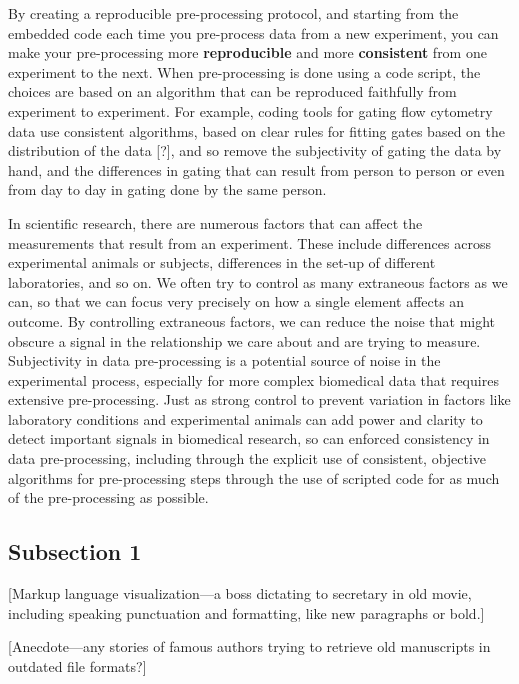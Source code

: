 \documentclass[]{tufte-book}
\begin{document}
By creating a reproducible pre-processing protocol, and starting from the
embedded code each time you pre-process data from a new experiment, you can
make your pre-processing more \textbf{reproducible} and more \textbf{consistent} from
one experiment to the next. When pre-processing is done using a code script,
the choices are based on an algorithm that can be reproduced faithfully from
experiment to experiment. For example, coding tools for gating flow cytometry
data use consistent algorithms, based on clear rules for fitting gates based
on the distribution of the data {[}?{]}, and so remove the subjectivity of
gating the data by hand, and the differences in gating that can result from
person to person or even from day to day in gating done by the same person.

In scientific research, there are numerous factors that can affect the
measurements that result from an experiment. These include differences across
experimental animals or subjects, differences in the set-up of different
laboratories, and so on. We often try to control as many extraneous factors as
we can, so that we can focus very precisely on how a single element affects an
outcome. By controlling extraneous factors, we can reduce the noise that might
obscure a signal in the relationship we care about and are trying to measure.
Subjectivity in data pre-processing is a potential source of noise in the
experimental process, especially for more complex biomedical data that requires
extensive pre-processing. Just as strong control to prevent variation in factors
like laboratory conditions and experimental animals can add power and clarity to
detect important signals in biomedical research, so can enforced consistency in
data pre-processing, including through the explicit use of consistent, objective
algorithms for pre-processing steps through the use of scripted code for as much
of the pre-processing as possible.

\hypertarget{subsection-1}{%
\subsection{Subsection 1}\label{subsection-1}}

{[}Markup language visualization---a boss dictating to secretary in old movie, including
speaking punctuation and formatting, like new paragraphs or bold.{]}

{[}Anecdote---any stories of famous authors trying to retrieve old manuscripts in
outdated file formats?{]}
\end{document}

